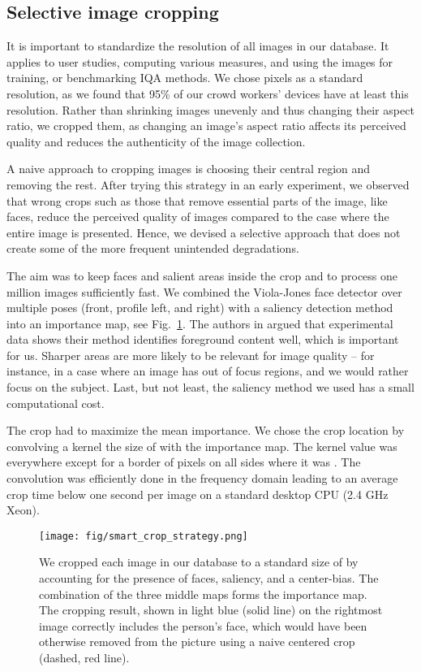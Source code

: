 \documentclass[10pt,journal,compsoc]{IEEEtran}
\begin{document}
\subsection{Selective image cropping}
\label{sec:selective_cropping}
It is important to standardize the resolution of all images in our database. It applies to user studies, computing various measures, and using the images for training, or benchmarking IQA methods. We chose  pixels as a standard resolution, as we found that 95\% of our crowd workers' devices have at least this resolution. Rather than shrinking images unevenly and thus changing their aspect ratio, we cropped them, as changing an image's aspect ratio affects its perceived quality and reduces the authenticity of the image collection.

A naive approach to cropping images is choosing their central region and removing the rest. After trying this strategy in an early experiment, we observed that wrong crops such as those that remove essential parts of the image, like faces, reduce the perceived quality of images compared to the case where the entire image is presented. Hence, we devised a selective approach that does not create some of the more frequent unintended degradations.

The aim was to keep faces and salient areas inside the crop and to process one million images sufficiently fast. We combined the Viola-Jones face detector \cite{viola2004robust} over multiple poses (front, profile left, and right) with a saliency detection method \cite{hou_image_2012} into an importance map, see Fig.~\ref{fig:smart_crop}. The authors in \cite{hou_image_2012} argued that experimental data shows their method identifies foreground content well, which is important for us.  Sharper areas are more likely to be relevant for image quality -- for instance, in a case where an image has out of focus regions, and we would rather focus on the subject. Last, but not least, the saliency method we used has a small computational cost. 

The crop had to maximize the mean importance. We chose the crop location by convolving a kernel the size of  with the importance map. The kernel value was  everywhere except for a border of   pixels on all sides where it was . The convolution was efficiently done in the frequency domain leading to an average crop time below one second per image on a standard desktop CPU (2.4 GHz Xeon).

\begin{figure}[!htbp]
\centering
\texttt{[image: fig/smart\_crop\_strategy.png]}
\caption{We cropped each image in our database to a standard size of  by accounting for the presence of faces, saliency, and a center-bias. The combination of the three middle maps forms the importance map. The cropping result, shown in light blue (solid line) on the rightmost image correctly includes the person's face, which would have been otherwise removed from the picture using a naive centered crop (dashed, red line).}
\label{fig:smart_crop}
\vspace{-10pt}
\end{figure}
\end{document}
